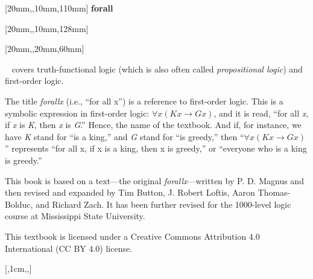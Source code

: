 \documentclass[bleedwidth=6.35mm, marklength=0mm, coverheight=228.6mm, coverwidth=152.4mm, spinewidth=13.9mm]{bookcover}
\begin{document}
\begin{bookcover}

[20mm,,10mm,110mm]{\sffamily   %
\fontsize{44}{44}\selectfont\hfill \textbf{forall\textcolor{white}{x}}} 		%

[20mm,,10mm,128mm]{\sffamily
\fontsize{20}{20}\selectfont\hfill \textbf{\textls{\textcolor{white}{THE MISSISSIPPI STATE EDITION}}}}  







[20mm,,20mm,60mm]{\sffamily    %
\textcolor{white}{}~ covers truth-functional logic (which is also often called \textit{propositional logic}) and first-order logic. 

\quad The title \textit{forallx} (i.e., ``for all x'') is a reference to first-order logic. This is a symbolic expression in first-order logic: $\forall x(Kx \rightarrow Gx)$, and it is read, ``for all \textit{x}, if \textit{x} is \textit{K}, then \textit{x} is \textit{G}.'' Hence, the name of the textbook. And if, for instance, we have \textit{K} stand for ``is a king,'' and \textit{G} stand for ``is greedy,'' then ``$\forall x(Kx \rightarrow Gx)$'' represents ``for all x, if x is a king, then x is greedy,'' or ``everyone who is a king is greedy.''

\quad This book is based on a text---the original \textit{forallx}---written by P. D. Magnus and then revised and expanded by Tim Button, J. Robert Loftis, Aaron Thomas-Bolduc, and Richard Zach. It has been further revised for the 1000-level logic course at Mississippi State University.

\quad This textbook is licensed under a Creative Commons Attribution 4.0 International (CC BY 4.0) license.  
}


[,1cm,,]{
\vfill
\centering\textcolor{forallx-orange}{
\colorbox{white}{%
}}}


\end{bookcover}
\end{document}
